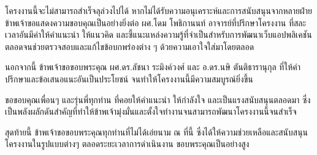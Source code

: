 \begin{acknowledgments}

โครงงานนี้จะไม่สามารถสำเร็จลุล่วงไปได้ หากไม่ได้รับความอนุเคราะห์และการสนับสนุนจากหลายฝ่าย ข้าพเจ้าขอแสดงความขอบคุณเป็นอย่างยิ่งต่อ ผศ.โดม โพธิกานนท์ อาจารย์ที่ปรึกษาโครงงาน ที่สละเวลาอันมีค่าให้คำแนะนำ ให้แนวคิด และชี้แนะแหล่งความรู้ที่จำเป็นสำหรับการพัฒนาเว็บแอปพลิเคชัน ตลอดจนช่วยตรวจสอบและแก้ไขข้อบกพร่องต่าง ๆ ด้วยความเอาใจใส่มาโดยตลอด

นอกจากนี้ ข้าพเจ้าขอขอบพระคุณ ผศ.ดร.ลัชนา ระมิงค์วงศ์ และ อ.ดร.นษิ ตันติธารานุกุล ที่ให้คำปรึกษาและข้อเสนอแนะอันเป็นประโยชน์ จนทำให้โครงงานนี้มีความสมบูรณ์ยิ่งขึ้น

ขอขอบคุณเพื่อนๆ และรุ่นพี่ทุกท่าน ที่คอยให้คำแนะนำ ให้กำลังใจ และเป็นแรงสนับสนุนตลอดมา ซึ่งเป็นพลังผลักดันสำคัญที่ทำให้ข้าพเจ้ามุ่งมั่นและตั้งใจทำงานจนสามารถพัฒนาโครงงานนี้จนสำเร็จ

สุดท้ายนี้ ข้าพเจ้าขอขอบพระคุณทุกท่านที่ไม่ได้เอ่ยนาม ณ ที่นี้ ซึ่งได้ให้ความช่วยเหลือและสนับสนุนโครงงานในรูปแบบต่างๆ ตลอดระยะเวลาการดำเนินงาน ขอบพระคุณเป็นอย่างสูง

\end{acknowledgments}%
\fi %

\contentspage

\ifproject
\figurelistpage

\tablelistpage
\fi %



